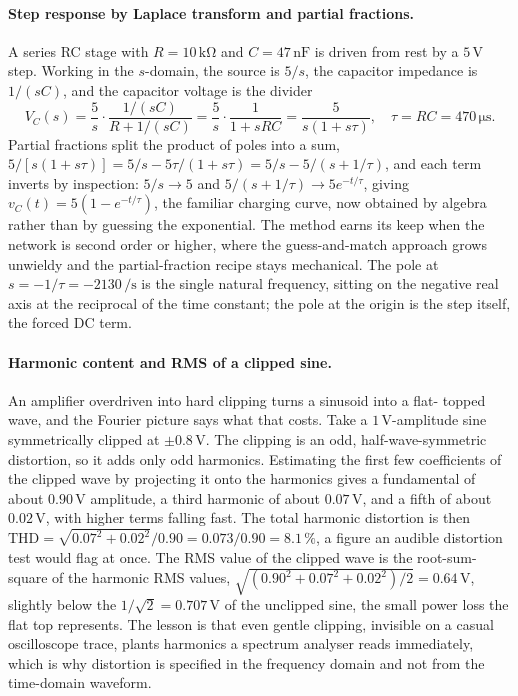 \paragraph{Step response by Laplace transform and partial fractions.}
A series RC stage with $R = 10\,\si{\kilo\ohm}$ and $C = 47\,\si{\nano
\farad}$ is driven from rest by a $5\,\si{\volt}$ step. Working in the
$s$-domain, the source is $5/s$, the capacitor impedance is $1/(sC)$, and
the capacitor voltage is the divider
\[
V_C(s) = \frac{5}{s}\cdot\frac{1/(sC)}{R + 1/(sC)}
= \frac{5}{s}\cdot\frac{1}{1 + sRC}
= \frac{5}{s(1 + s\tau)},
\quad \tau = RC = 470\,\si{\micro\second}.
\]
Partial fractions split the product of poles into a sum,
$5/[s(1 + s\tau)] = 5/s - 5\tau/(1 + s\tau) = 5/s - 5/(s + 1/\tau)$, and
each term inverts by inspection: $5/s \to 5$ and $5/(s + 1/\tau) \to
5e^{-t/\tau}$, giving $v_C(t) = 5(1 - e^{-t/\tau})$, the familiar charging
curve, now obtained by algebra rather than by guessing the exponential.
The method earns its keep when the network is second order or higher,
where the guess-and-match approach grows unwieldy and the partial-fraction
recipe stays mechanical. The pole at $s = -1/\tau = -2130\,\si{\per
\second}$ is the single natural frequency, sitting on the negative real
axis at the reciprocal of the time constant; the pole at the origin is the
step itself, the forced DC term.

\paragraph{Harmonic content and RMS of a clipped sine.}
An amplifier overdriven into hard clipping turns a sinusoid into a flat-
topped wave, and the Fourier picture says what that costs. Take a
$1\,\si{\volt}$-amplitude sine symmetrically clipped at $\pm 0.8\,\si{
\volt}$. The clipping is an odd, half-wave-symmetric distortion, so it adds
only odd harmonics. Estimating the first few coefficients of the clipped
wave by projecting it onto the harmonics gives a fundamental of about
$0.90\,\si{\volt}$ amplitude, a third harmonic of about $0.07\,\si{\volt}$,
and a fifth of about $0.02\,\si{\volt}$, with higher terms falling fast.
The total harmonic distortion is then $\text{THD} =
\sqrt{0.07^{2} + 0.02^{2}}/0.90 = 0.073/0.90 = 8.1\,\%$, a figure an
audible distortion test would flag at once. The RMS value of the clipped
wave is the root-sum-square of the harmonic RMS values, $\sqrt{(0.90^{2} +
0.07^{2} + 0.02^{2})/2} = 0.64\,\si{\volt}$, slightly below the
$1/\sqrt{2} = 0.707\,\si{\volt}$ of the unclipped sine, the small power
loss the flat top represents. The lesson is that even gentle clipping,
invisible on a casual oscilloscope trace, plants harmonics a spectrum
analyser reads immediately, which is why distortion is specified in the
frequency domain and not from the time-domain waveform.


